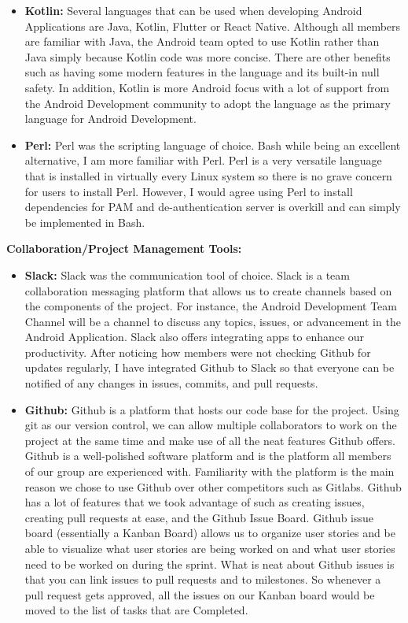 \documentclass[letterpaper,twocolumn,10pt]{article}
\begin{document}
\begin{itemize}[noitemsep]
\item \textbf{Kotlin:} Several languages that can be used when developing Android Applications are Java, Kotlin, Flutter or React Native. Although all members are familiar with Java, the Android team opted to use Kotlin rather than Java simply because Kotlin code was more concise. There are other benefits such as having some modern features in the language and its built-in null safety. In addition, Kotlin is more Android focus with a lot of support from the Android Development community to adopt the language as the primary language for Android Development.
\item \textbf{Perl:} Perl was the scripting language of choice. Bash while being an excellent alternative, I am more familiar with Perl. Perl is a very versatile language that is installed in virtually every Linux system so there is no grave concern for users to install Perl. However, I would agree using Perl to install dependencies for PAM and de-authentication server is overkill and can simply be implemented in Bash.
\end{itemize}

\hrulefill

\textbf{Collaboration/Project Management Tools:}
\begin{itemize}[noitemsep]
\item \textbf{Slack:} Slack was the communication tool of choice. Slack is a team collaboration messaging platform that allows us to create channels based on the components of the project. For instance, the Android Development Team Channel will be a channel to discuss any topics, issues, or advancement in the Android Application. Slack also offers integrating apps to enhance our productivity. After noticing how members were not checking Github for updates regularly, I have integrated Github to Slack so that everyone can be notified of any changes in issues, commits, and pull requests.
\item \textbf{Github:} Github is a platform that hosts our code base for the project. Using git as our version control, we can allow multiple collaborators to work on the project at the same time and make use of all the neat features Github offers. Github is a well-polished software platform and is the platform all members of our group are experienced with. Familiarity with the platform is the main reason we chose to use Github over other competitors such as Gitlabs. Github has a lot of features that we took advantage of such as creating issues, creating pull requests at ease, and the Github Issue Board. Github issue board (essentially a Kanban Board) allows us to organize user stories and be able to visualize what user stories are being worked on and what user stories need to be worked on during the sprint. What is neat about Github issues is that you can link issues to pull requests and to milestones. So whenever a pull request gets approved, all the issues on our Kanban board would be moved to the list of tasks that are Completed. 
\end{itemize}
\end{document}
